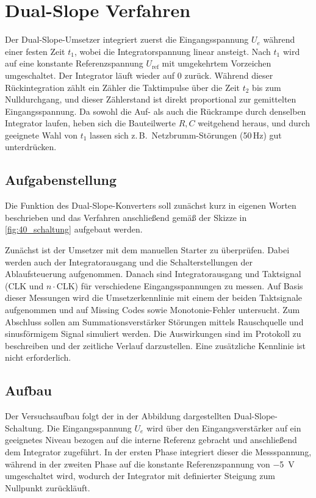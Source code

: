 \newpage
\section{Dual-Slope Verfahren}
Der Dual-Slope-Umsetzer integriert zuerst die Eingangsspannung \(U_e\) während einer festen Zeit \(t_1\), wobei die Integratorspannung linear ansteigt. Nach \(t_1\) wird auf eine konstante Referenzspannung \(U_{\text{ref}}\) mit umgekehrtem Vorzeichen umgeschaltet. Der Integrator läuft wieder auf 0 zurück. Während dieser Rückintegration zählt ein Zähler die Taktimpulse über die Zeit \(t_2\) bis zum Nulldurchgang, und dieser Zählerstand ist direkt proportional zur gemittelten Eingangsspannung. Da sowohl die Auf- als auch die Rückrampe durch denselben Integrator laufen, heben sich die Bauteilwerte \(R, C\) weitgehend heraus, und durch geeignete Wahl von \(t_1\) lassen sich z.\,B.\ Netzbrumm-Störungen (50\,Hz) gut unterdrücken.

\subsection{Aufgabenstellung}
Die Funktion des Dual-Slope-Konverters soll zunächst kurz in eigenen Worten beschrieben und das Verfahren anschließend gemäß der Skizze in \autoref{fig:40_schaltung} aufgebaut werden.

Zunächst ist der Umsetzer mit dem manuellen Starter zu überprüfen. Dabei werden auch der Integratorausgang und die Schalterstellungen der Ablaufsteuerung aufgenommen. Danach sind Integratorausgang und Taktsignal (CLK und \(n\!\cdot\!\mathrm{CLK}\)) für verschiedene Eingangsspannungen zu messen. Auf Basis dieser Messungen wird die Umsetzerkennlinie mit einem der beiden Taktsignale aufgenommen und auf Missing Codes sowie Monotonie-Fehler untersucht.
Zum Abschluss sollen am Summationsverstärker Störungen mittels Rauschquelle und sinusförmigem Signal simuliert werden. Die Auswirkungen sind im Protokoll zu beschreiben und der zeitliche Verlauf darzustellen. Eine zusätzliche Kennlinie ist nicht erforderlich.


\subsection{Aufbau}
Der Versuchsaufbau folgt der in der Abbildung dargestellten Dual-Slope-Schaltung. Die Eingangsspannung $U_e$ wird über den Eingangsverstärker auf ein geeignetes Niveau bezogen auf die interne Referenz gebracht und anschließend dem Integrator zugeführt. In der ersten Phase integriert dieser die Messspannung, während in der zweiten Phase auf die konstante Referenzspannung von \SI{-5}{\volt} umgeschaltet wird, wodurch der Integrator mit definierter Steigung zum Nullpunkt zurückläuft.

